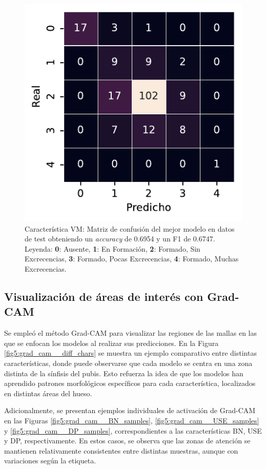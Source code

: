 \begin{figure}[htbp]
    \vspace{1.5em} %

    \includegraphics[width=0.6\linewidth]{figures/5_experiments/single-vm-cm.pdf}
    \caption[Característica VM: Matriz de confusión del mejor modelo en datos de test.]{Característica VM: Matriz de confusión del mejor modelo en datos de test obteniendo un \textit{accuracy} de 0.6954 y un F1 de 0.6747. Leyenda: \textbf{0}: Ausente, \textbf{1}: En Formación, \textbf{2}: Formado, Sin Excrecencias, \textbf{3}: Formado, Pocas Excrecencias, \textbf{4}: Formado, Muchas Excrecencias.}
    \label{fig5:VM_confusion_matrix}
\end{figure}

\FloatBarrier

\subsection{Visualización de áreas de interés con Grad-CAM}

Se empleó el método Grad-CAM para visualizar las regiones de las mallas en las que se enfocan los modelos al realizar sus predicciones. En la Figura \ref{fig5:grad_cam__diff_chars} se muestra un ejemplo comparativo entre distintas características, donde puede observarse que cada modelo se centra en una zona distinta de la sínfisis del pubis. Esto refuerza la idea de que los modelos han aprendido patrones morfológicos específicos para cada característica, localizados en distintas áreas del hueso. 

Adicionalmente, se presentan ejemplos individuales de activación de Grad-CAM en las Figuras \ref{fig5:grad_cam__BN_samples}, \ref{fig5:grad_cam__USE_samples} y \ref{fig5:grad_cam__DP_samples}, correspondientes a las características BN, USE y DP, respectivamente. En estos casos, se observa que las zonas de atención se mantienen relativamente consistentes entre distintas muestras, aunque con variaciones según la etiqueta.

